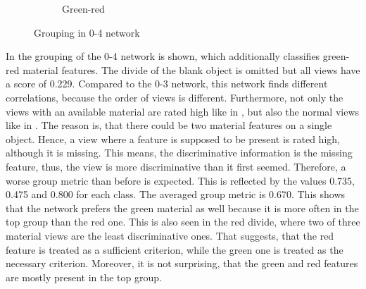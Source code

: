\begin{figure}
\begin{subfigure}{\textwidth}
		\caption{Green-red}
		\label{fig:grouping-0-4-green-red}
	\end{subfigure}
	\caption[Grouping in 0-4 network]{Grouping in 0-4 network}
	\label{fig:grouping-0-4}
\end{figure}
In  the grouping of the 0-4 network is shown, which additionally classifies green-red material features.
The divide of the blank object is omitted but all views have a score of 0.229.
Compared to the 0-3 network, this network finds different correlations, because the order of views is different.
Furthermore, not only the views with an available material are rated high like in , but also the normal views like in .
The reason is, that there could be two material features on a single object.
Hence, a view where a feature is supposed to be present is rated high, although it is missing.
This means, the discriminative information is the missing feature, thus, the view is more discriminative than it first seemed.
Therefore, a worse group metric than before is expected.
This is reflected by the values 0.735, 0.475 and 0.800 for each class.
The averaged group metric is 0.670.
This shows that the network prefers the green material as well because it is more often in the top group than the red one.
This is also seen in the red divide, where two of three material views are the least discriminative ones.
That suggests, that the red feature is treated as a sufficient criterion, while the green one is treated as the necessary criterion.
Moreover, it is not surprising, that the green and red features are mostly present in the top group.
